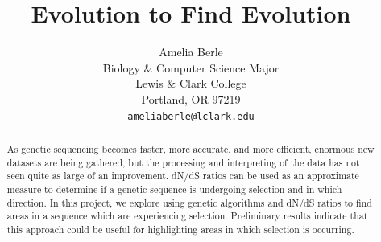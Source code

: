 \documentclass{article}
\title{Evolution to Find Evolution}
\author{
  Amelia Berle\\%
   Biology \& Computer Science Major\\
  Lewis \& Clark College\\
  Portland, OR 97219 \\
  \texttt{ameliaberle@lclark.edu} \\
}
\begin{document}
\maketitle

\begin{abstract}
As genetic sequencing becomes faster, more accurate, and more efficient, enormous new datasets are being gathered, but the processing and interpreting of the data has not seen quite as large of an improvement.  dN/dS ratios can be used as an approximate measure to determine if a genetic sequence is undergoing selection and in which direction.  In this project, we explore using genetic algorithms and dN/dS ratios to find areas in a sequence which are experiencing selection.  Preliminary results indicate that this approach could be useful for highlighting areas in which selection is occurring.
\end{abstract}


\end{document}
